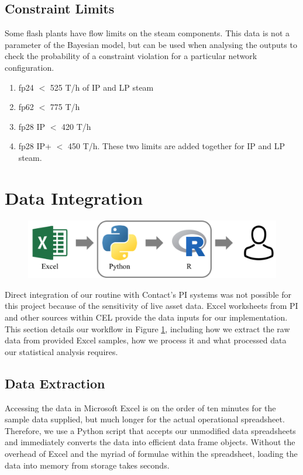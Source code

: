 \documentclass[a4paper, 12pt]{article}
\begin{document}
\subsection{Constraint Limits}
Some flash plants have flow limits on the steam components. This data is not a parameter of the Bayesian model, but can be used when analysing the outputs to check the probability of a constraint violation for a particular network configuration.
\begin{enumerate}
\item fp24 $<$ 525 T/h of IP and LP steam
\item fp62 $<$ 775 T/h
\item fp28 IP $<$ 420 T/h
\item fp28 IP+ $<$ 450 T/h. These two limits are added together for IP and LP steam.
\end{enumerate}

\section{Data Integration}

\begin{figure}
  \centering
  \includegraphics[width=0.5\linewidth]{media/workflow}
  \label{fig:workflow}
\end{figure}

Direct integration of our routine with Contact's PI systems was not possible for this project because of the sensitivity of live asset data. Excel worksheets from PI and other sources within CEL provide the data inputs for our implementation. This section details our workflow in Figure \ref{fig:workflow}, including how we extract the raw data from provided Excel samples, how we process it and what processed data our statistical analysis requires.

\subsection{Data Extraction}
Accessing the data in Microsoft Excel is on the order of ten minutes for the sample data supplied, but much longer for the actual operational spreadsheet. Therefore, we use a Python script that accepts our unmodified data spreadsheets and immediately converts the data into efficient data frame objects. Without the overhead of Excel and the myriad of formulae within the spreadsheet, loading the data into memory from storage takes seconds.
\end{document}
